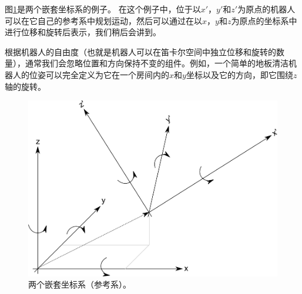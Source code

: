 
图\ref{fig:nestedcoords}是两个嵌套坐标系的例子。 在这个例子中，位于以$x'$，$y'$和$z'$为原点的机器人可以在它自己的参考系中规划运动，然后可以通过在以$x$，$y$和$z$为原点的坐标系中进行位移和旋转后表示，我们稍后会讲到。


根据机器人的自由度（也就是机器人可以在笛卡尔空间中独立位移和旋转的数量），通常我们会忽略位置和方向保持不变的组件。例如，一个简单的地板清洁机器人的位姿可以完全定义为它在一个房间内的$ x $和$ y $坐标以及它的方向，即它围绕$ z $轴的旋转。

\begin{figure}
	\centering
		\includegraphics[width=\textwidth]{figs/frameofreference.png}
	\caption{两个嵌套坐标系（参考系）。}
	\label{fig:nestedcoords}
\end{figure}

